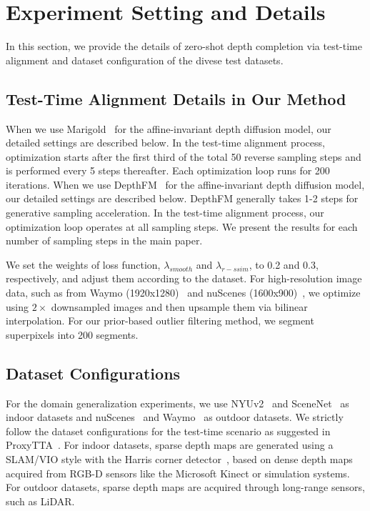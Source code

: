 \section{Experiment Setting and Details}
\label{sec:dataset}
In this section, we provide the details of zero-shot depth completion via test-time alignment and dataset configuration of the divese test datasets.


\subsection{Test-Time Alignment Details in Our Method}
\noindent When we use Marigold~\cite{ke2023repurposing} for the affine-invariant depth diffusion model, our detailed settings are described below.
In the test-time alignment process, optimization starts after the first third of the total 50 reverse sampling steps and is performed every 5 steps thereafter.
Each optimization loop runs for 200 iterations. 
When we use DepthFM~\cite{gui2024depthfm} for the affine-invariant depth diffusion model, our detailed settings are described below.
DepthFM generally takes 1-2 steps for generative sampling acceleration. In the test-time alignment process, our optimization loop operates at all sampling steps. We present the results for each number of sampling steps in the main paper.

\noindent We set the weights of loss function, $\lambda_{smooth}$ and $\lambda_{r-ssim}$, to 0.2 and 0.3, respectively, and adjust them according to the dataset.
For high-resolution image data, such as from Waymo (1920x1280)~\cite{sun2020waymo} and nuScenes (1600x900)~\cite{caesar2020nuscene}, we optimize using $2\times$ downsampled images and then upsample them via bilinear interpolation. 
For our prior-based outlier filtering method, we segment superpixels into 200 segments. 




\subsection{Dataset Configurations}
For the domain generalization experiments, we use NYUv2~\cite{silberman2012nyu} and SceneNet~\cite{mccormac2017scenenet} as indoor datasets and nuScenes~\cite{caesar2020nuscene} and Waymo~\cite{sun2020waymo} as outdoor datasets.
We strictly follow the dataset configurations for the test-time scenario as suggested in ProxyTTA~\cite{park2024testtime}.
For indoor datasets, sparse depth maps are generated using a SLAM/VIO style with the Harris corner detector~\cite{harris1988combined}, based on dense depth maps acquired from RGB-D sensors like the Microsoft Kinect or simulation systems.
For outdoor datasets, sparse depth maps are acquired through long-range sensors, such as LiDAR.


